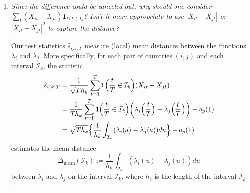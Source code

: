 \documentclass[a4paper,12pt]{article}
\begin{document}
\begin{enumerate}[label=(\arabic*),leftmargin=0.7cm]

\item \textit{Since the difference could be canceled out, why should one consider} $\sum\nolimits_t (X_{it} - X_{jt})\mathbf{1}_{t/T \in I_k}$\textit{? Isn't it more appropriate to use} $|X_{it} - X_{jt}|$ \textit{ or } $|X_{it} - X_{jt}|^2$ \textit{to capture the distance?}

Our test statistics $\hat{s}_{ijk,T}$ measure (local) mean distances between the functions $\lambda_i$ and $\lambda_j$. More specifically, for each pair of countries $(i,j)$ and each interval $\mathcal{I}_k$, the statistic
\begin{align*} 
\hat{s}_{ijk,T} 
 & = \frac{1}{\sqrt{Th_k}} \sum\limits_{t=1}^T \boldsymbol{1}\Big(\frac{t}{T} \in \mathcal{I}_k\Big) (X_{it} - X_{jt}) \\
 & = \frac{1}{Th_k} \sum\limits_{t=1}^T \boldsymbol{1}\Big(\frac{t}{T} \in \mathcal{I}_k\Big) \bigg( \lambda_i \Big(\frac{t}{T}\Big)  - \lambda_j \Big(\frac{t}{T}\Big)\bigg) + o_p(1) \\
 & = \sqrt{Th_k} \Big\{ \frac{1}{h_k} \int_{\mathcal{I}_k} (\lambda_i(u) - \lambda_j(u)) du \Big\} + o_p(1) 
\end{align*}
estimates the mean distance 
\[ \Delta_{\text{mean}}(\mathcal{I}_k) := \frac{1}{h_k} \int_{\mathcal{I}_k} (\lambda_i(u) - \lambda_j(u)) du \]
between $\lambda_i$ and $\lambda_j$ on the interval $\mathcal{I}_k$, where $h_k$ is the length of the interval $\mathcal{I}_k$. 
%
%

\end{enumerate}
\end{document}

